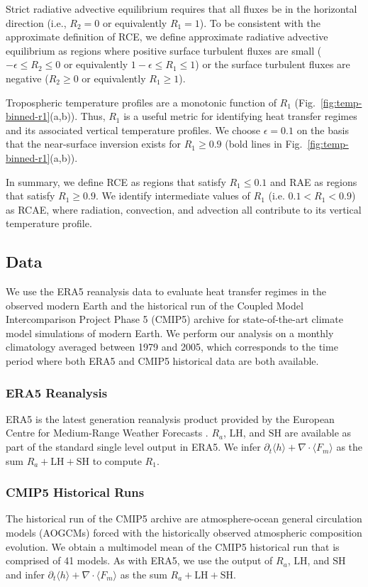 \documentclass{ametsocV5}
\begin{document}
    Strict radiative advective equilibrium requires that all fluxes be in the horizontal direction (i.e., \(R_{2}=0\) or equivalently \(R_{1}=1\)). To be consistent with the approximate definition of RCE, we define approximate radiative advective equilibrium as regions where positive surface turbulent fluxes are small (\(-\epsilon \le R_{2} \le 0 \) or equivalently \(1-\epsilon \le R_{1} \le 1\)) or the surface turbulent fluxes are negative (\(R_{2} \ge 0 \) or equivalently \(R_{1} \ge 1\)).
    
    Tropospheric temperature profiles are a monotonic function of $R_{1}$ (Fig.~\ref{fig:temp-binned-r1}(a,b)). Thus, $R_{1}$ is a useful metric for identifying heat transfer regimes and its associated vertical temperature profiles. We choose $\epsilon=0.1$ on the basis that the near-surface inversion exists for $R_{1} \ge 0.9$ (bold lines in Fig.~\ref{fig:temp-binned-r1}(a,b)).
    
    In summary, we define RCE as regions that satisfy \(R_{1}\le 0.1\) and RAE as regions that satisfy \(R_{1}\ge 0.9\). We identify intermediate values of \(R_{1}\) (i.e. \(0.1 < R_{1} < 0.9\)) as RCAE, where radiation, convection, and advection all contribute to its vertical temperature profile.

\subsection{Data}
    We use the ERA5 reanalysis data to evaluate heat transfer regimes in the observed modern Earth and the historical run of the Coupled Model Intercomparison Project Phase 5 (CMIP5) archive for state-of-the-art climate model simulations of modern Earth. We perform our analysis on a monthly climatology averaged between 1979 and 2005, which corresponds to the time period where both ERA5 and CMIP5 historical data are both available. 
  
    \subsubsection{ERA5 Reanalysis}
    ERA5 is the latest generation reanalysis product provided by the European Centre for Medium-Range Weather Forecasts \citep{hersbach2020}. $R_a$, $\mathrm{LH}$, and $\mathrm{SH}$ are available as part of the standard single level output in ERA5. We infer $\partial_t \langle h \rangle + \nabla\cdot\langle F_m \rangle$ as the sum $R_a + \mathrm{LH} + \mathrm{SH}$ to compute $R_1$.
    
    \subsubsection{CMIP5 Historical Runs}
    The historical run of the CMIP5 archive are atmosphere-ocean general circulation models (AOGCMs) forced with the historically observed atmospheric composition evolution. We obtain a multimodel mean of the CMIP5 historical run that is comprised of 41 models. As with ERA5, we use the output of $R_a$, $\mathrm{LH}$, and $\mathrm{SH}$ and infer $\partial_t \langle h \rangle + \nabla\cdot\langle F_m \rangle$ as the sum $R_a + \mathrm{LH} + \mathrm{SH}$.
\end{document}

